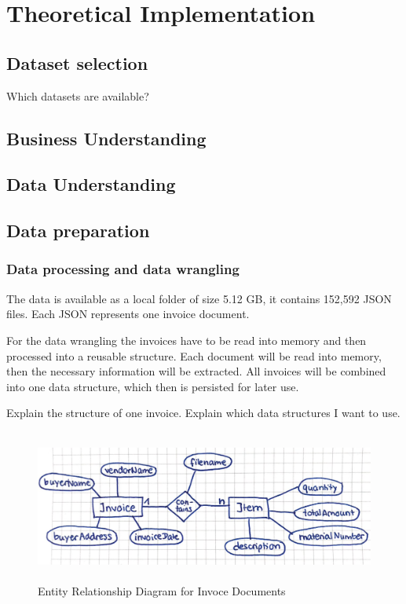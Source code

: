 \chapter{Theoretical Implementation}

\section{Dataset selection}
Which datasets are available?


\section{Business Understanding}

\section{Data Understanding}



\section{Data preparation}

\subsection{Data processing and data wrangling}
The data is available as a local folder of size 5.12 GB, it contains 152,592 \ac{JSON} files. Each \ac{JSON} represents one invoice document. 
	
For the data wrangling the invoices have to be read into memory and then processed into a reusable structure. Each document will be read into memory, then the necessary information will be extracted. All invoices will be combined into one data structure, which then is persisted for later use.

Explain the structure of one invoice.
Explain which data structures I want to use.

\begin{figure}[ht]
	\centering
	\includegraphics[height=5cm]{Bilder/practical/entity_relationship.png}
	\caption{Entity Relationship Diagram for Invoce Documents}
	\label{fig:er}
\end{figure}


